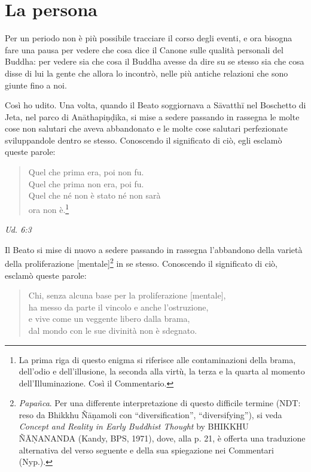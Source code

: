 \chapter{La persona}

 Per un periodo non è più possibile tracciare il corso
degli eventi, e ora bisogna fare una pausa per vedere che cosa dice il
Canone sulle qualità personali del Buddha: per vedere sia che cosa il
Buddha avesse da dire su se stesso sia che cosa disse di lui la gente
che allora lo incontrò, nelle più antiche relazioni che sono giunte fino
a noi.


 Così ho udito. Una volta, quando il Beato soggiornava a
Sāvatthī nel Boschetto di Jeta, nel parco di Anāthapiṇḍika, si mise a
sedere passando in rassegna le molte cose non salutari che aveva
abbandonato e le molte cose salutari perfezionate sviluppandole dentro
se stesso. Conoscendo il significato di ciò, egli esclamò queste parole:


\begin{quote}
Quel che prima era, poi non fu. \\
Quel che prima non era, poi fu. \\
Quel che né non è stato né non sarà \\
ora non è.\footnote{La prima riga di questo enigma si riferisce alle contaminazioni della brama, dell’odio e dell’illusione, la seconda alla virtù, la terza e la quarta al momento dell’Illuminazione. Così il Commentario.}
\end{quote}

\emph{Ud. 6:3}


Il Beato si mise di nuovo a sedere passando in rassegna l’abbandono
della varietà della proliferazione [mentale]\footnote{\emph{Papañca}. Per una differente interpretazione di questo difficile termine (NDT: reso da Bhikkhu Ñāṇamoli con “diversification”, “diversifying”), si veda \emph{Concept and Reality in Early Buddhist Thought} by BHIKKHU ÑĀṆANANDA (Kandy, BPS, 1971), dove, alla p. 21, è offerta una traduzione alternativa del verso seguente e della sua spiegazione nei Commentari (Nyp.).} in se
stesso. Conoscendo il significato di ciò, esclamò queste parole:


\begin{quote}
Chi, senza alcuna base per la proliferazione [mentale], \\
ha messo da parte il vincolo e anche l’ostruzione, \\
e vive come un veggente libero dalla brama, \\
dal mondo con le sue divinità non è sdegnato.
\end{quote}

